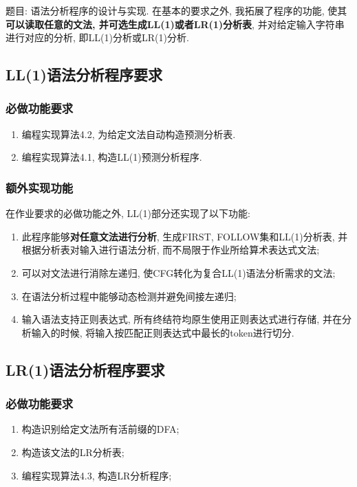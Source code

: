 题目: 语法分析程序的设计与实现. 在基本的要求之外, 我拓展了程序的功能,
使其\textbf{可以读取任意的文法, 并可选生成LL(1)或者LR(1)分析表},
并对给定输入字符串进行对应的分析, 即LL(1)分析或LR(1)分析.\par

\subsection{LL(1)语法分析程序要求}
\subsubsection{必做功能要求}
\begin{enumerate}
	\item 编程实现算法4.2, 为给定文法自动构造预测分析表.
	\item 编程实现算法4.1, 构造LL(1)预测分析程序.
\end{enumerate}

\subsubsection{额外实现功能}
在作业要求的必做功能之外, LL(1)部分还实现了以下功能:
\begin{enumerate}
	\item 此程序能够\textbf{对任意文法进行分析}, 生成FIRST, FOLLOW集和LL(1)分析表,
	      并根据分析表对输入进行语法分析, 而不局限于作业所给算术表达式文法;
	\item 可以对文法进行消除左递归, 使CFG转化为复合LL(1)语法分析需求的文法;
	\item 在语法分析过程中能够动态检测并避免间接左递归;
	\item 输入语法支持正则表达式, 所有终结符均原生使用正则表达式进行存储,
	      并在分析输入的时候, 将输入按匹配正则表达式中最长的token进行切分.
\end{enumerate}

\subsection{LR(1)语法分析程序要求}
\subsubsection{必做功能要求}
\begin{enumerate}
	\item 构造识别给定文法所有活前缀的DFA;
	\item 构造该文法的LR分析表;
	\item 编程实现算法4.3, 构造LR分析程序;
\end{enumerate}

